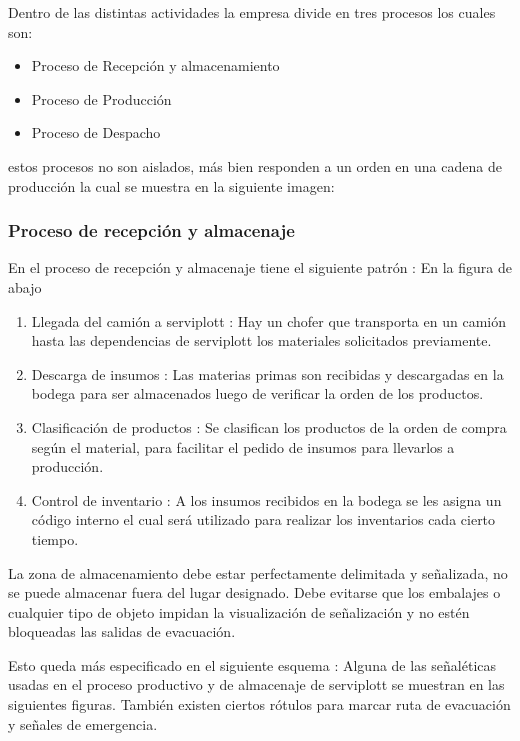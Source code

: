 Dentro de las distintas actividades la empresa divide en tres procesos los cuales son:
\begin{itemize}
\item Proceso de Recepción y almacenamiento
\item Proceso de Producción
\item Proceso de Despacho
\end{itemize}	
	estos procesos no son aislados, más bien responden a un orden en una cadena de producción la cual se muestra en la siguiente imagen:

\subsubsection{Proceso de recepción y almacenaje}
	En el proceso de recepción y almacenaje tiene el siguiente patrón :
	En la figura de abajo 
	\begin{enumerate}[1)]
	\item Llegada del camión a serviplott : Hay un chofer que transporta en un camión hasta las dependencias de serviplott los materiales solicitados previamente. 
    \item Descarga de insumos : Las materias primas son recibidas y descargadas en la bodega para ser almacenados luego de verificar la orden de los productos.
    \item Clasificación de productos : Se clasifican los productos de la orden de compra según el material, para facilitar el pedido de insumos para llevarlos a producción.
    \item Control de inventario : A los insumos recibidos en la bodega se les asigna un código interno el cual será utilizado para realizar los inventarios cada cierto tiempo.
    \end{enumerate}
		La zona de almacenamiento debe estar perfectamente delimitada y señalizada, no se puede almacenar fuera del lugar designado. Debe evitarse que los embalajes o cualquier tipo de objeto impidan la visualización de señalización y no estén bloqueadas las salidas de evacuación.
 
 
	Esto queda más especificado en el siguiente esquema : 
	\newpage
		 Alguna de las señaléticas usadas en el proceso productivo y de almacenaje de serviplott se muestran en las siguientes figuras.
		 También existen ciertos rótulos para marcar ruta de evacuación y señales de emergencia.
		
